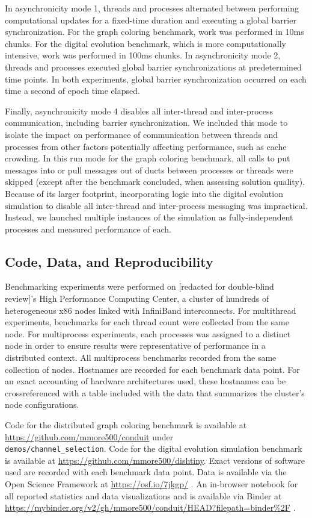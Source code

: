 In asynchronicity mode 1, threads and processes alternated between performing computational updates for a fixed-time duration and executing a global barrier synchronization.
For the graph coloring benchmark, work was performed in 10ms chunks.
For the digital evolution benchmark, which is more computationally intensive, work was performed in 100ms chunks.
In asynchronicity mode 2, threads and processes executed global barrier synchronizations at predetermined time points.
In both experiments, global barrier synchronization occurred on each time a second of epoch time elapsed.

Finally, asynchronicity mode 4 disables all inter-thread and inter-process communication, including barrier synchronization.
We included this mode to isolate the impact on performance of communication between threads and processes from other factors potentially affecting performance, such as cache crowding.
In this run mode for the graph coloring benchmark, all calls to put messages into or pull messages out of ducts between processes or threads were skipped (except after the benchmark concluded, when assessing solution quality).
Because of its larger footprint, incorporating logic into the digital evolution simulation to disable all inter-thread and inter-process messaging was impractical.
Instead, we launched multiple instances of the simulation as fully-independent processes and measured performance of each.

\subsection{Code, Data, and Reproducibility}

Benchmarking experiments were performed on [redacted for double-blind review]'s High Performance Computing Center, a cluster of hundreds of heterogeneous x86 nodes linked with InfiniBand interconnects.
For multithread experiments, benchmarks for each thread count were collected from the same node.
For multiprocess experiments, each processes was assigned to a distinct node in order to ensure results were representative of performance in a distributed context.
All multiprocess benchmarks recorded from the same collection of nodes.
Hostnames are recorded for each benchmark data point.
For an exact accounting of hardware architectures used, these hostnames can be crossreferenced with a table included with the data that summarizes the cluster's node configurations.

Code for the distributed graph coloring benchmark is available at \url{https://github.com/mmore500/conduit} under \\ \texttt{demos/channel\_selection}.
Code for the digital evolution simulation benchmark is available at \url{https://github.com/mmore500/dishtiny}.
Exact versions of software used are recorded with each benchmark data point.
Data is available via the Open Science Framework at \url{https://osf.io/7jkgp/} \cite{foster2017open}.
An in-browser notebook for all reported statistics and data visualizations and is available via Binder at \url{https://mybinder.org/v2/gh/mmore500/conduit/HEAD?filepath=binder\%2F} \cite{jupyter2018binder}.